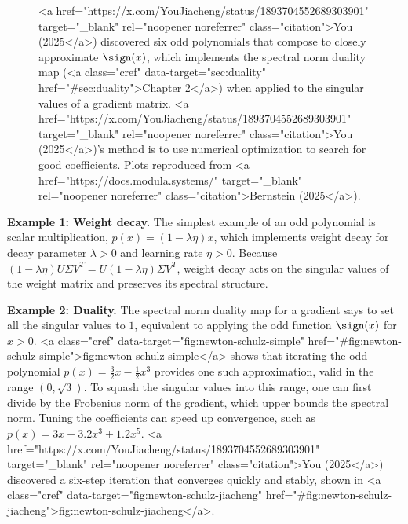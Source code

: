 \begin{figure}[htbp]
    \centering
    \subfloat{
        
    }
    \hspace{0.03\textwidth}
    \subfloat{
        
    }
    \caption{<a href="https://x.com/YouJiacheng/status/1893704552689303901" target="_blank" rel="noopener noreferrer" class="citation">You (2025</a>) discovered six odd polynomials that compose to closely approximate $\sign(x)$, which implements the spectral norm duality map (<a class="cref" data-target="sec:duality" href="#sec:duality">Chapter 2</a>) when applied to the singular values of a gradient matrix. <a href="https://x.com/YouJiacheng/status/1893704552689303901" target="_blank" rel="noopener noreferrer" class="citation">You (2025</a>)'s method is to use numerical optimization to search for good coefficients. Plots reproduced from <a href="https://docs.modula.systems/" target="_blank" rel="noopener noreferrer" class="citation">Bernstein (2025</a>).} %
    \label{fig:newton-schulz-jiacheng}
\end{figure}

\textbf{Example 1: Weight decay.} The simplest example of an odd polynomial is scalar multiplication, $p(x) = (1 - \lambda \eta)x$, which implements weight decay for decay parameter $\lambda > 0$ and learning rate $\eta > 0$. Because $(1 - \lambda \eta) U \Sigma V^T = U (1-\lambda \eta) \Sigma V^T$, weight decay acts on the singular values of the weight matrix and preserves its spectral structure.

\textbf{Example 2: Duality.} The spectral norm duality map for a gradient says to set all the singular values to $1$, equivalent to applying the odd function $\sign(x)$ for $x > 0$. <a class="cref" data-target="fig:newton-schulz-simple" href="#fig:newton-schulz-simple">fig:newton-schulz-simple</a> shows that iterating the odd polynomial $p(x) = \tfrac32 x - \tfrac12 x^3$ provides one such approximation, valid in the range $(0, \sqrt{3})$. To squash the singular values into this range, one can first divide by the Frobenius norm of the gradient, which upper bounds the spectral norm. Tuning the coefficients can speed up convergence, such as $p(x) = 3x - 3.2x^3 + 1.2x^5$. <a href="https://x.com/YouJiacheng/status/1893704552689303901" target="_blank" rel="noopener noreferrer" class="citation">You (2025</a>) discovered a six-step iteration that converges quickly and stably, shown in <a class="cref" data-target="fig:newton-schulz-jiacheng" href="#fig:newton-schulz-jiacheng">fig:newton-schulz-jiacheng</a>.

